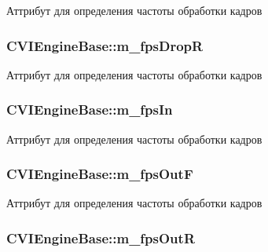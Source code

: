 Аттрибут для определения частоты обработки кадров 

\hypertarget{class_c_v_i_engine_base_a3bd5b977e29332c55f1eaf9a1192d03a}{
\subsubsection[{m\+\_\+fps\+Drop\+R}]{ C\+V\+I\+Engine\+Base\+::m\+\_\+fps\+Drop\+R}}\label{class_c_v_i_engine_base_a3bd5b977e29332c55f1eaf9a1192d03a}


Аттрибут для определения частоты обработки кадров 

\hypertarget{class_c_v_i_engine_base_a3f8d2ef96946316d4b11b4eef209cd35}{
\subsubsection[{m\+\_\+fps\+In}]{ C\+V\+I\+Engine\+Base\+::m\+\_\+fps\+In}}\label{class_c_v_i_engine_base_a3f8d2ef96946316d4b11b4eef209cd35}


Аттрибут для определения частоты обработки кадров 

\hypertarget{class_c_v_i_engine_base_a68263a05d2dcb87863aac27632c6fefa}{
\subsubsection[{m\+\_\+fps\+Out\+F}]{ C\+V\+I\+Engine\+Base\+::m\+\_\+fps\+Out\+F}}\label{class_c_v_i_engine_base_a68263a05d2dcb87863aac27632c6fefa}


Аттрибут для определения частоты обработки кадров 

\hypertarget{class_c_v_i_engine_base_a2ad39d8c6557ef3c0dd6fb9dc376c8b5}{
\subsubsection[{m\+\_\+fps\+Out\+R}]{ C\+V\+I\+Engine\+Base\+::m\+\_\+fps\+Out\+R}}\label{class_c_v_i_engine_base_a2ad39d8c6557ef3c0dd6fb9dc376c8b5}


